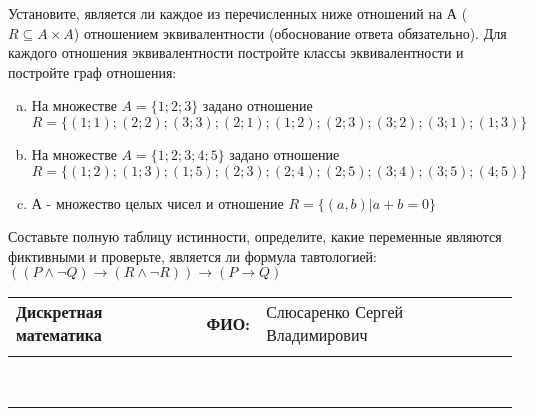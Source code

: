 \documentclass[10pt]{exam}
\newcommand{\class}{Дискретная математика}
\newcommand{\examdate}{}
\begin{document}
\begin{questions}
\question
Установите, является ли каждое из перечисленных ниже отношений на А ($R \subseteq A \times A$) отношением эквивалентности (обоснование ответа обязательно). Для каждого отношения эквивалентности постройте классы 
эквивалентности и постройте граф отношения:
\begin{enumerate} [a)]\setcounter{enumi}{0}
\item На множестве $A = \{1; 2; 3\}$ задано отношение $R = \{(1; 1); (2; 2); (3; 3); (2; 1); (1; 2); (2; 3); (3; 2); (3; 1); (1; 3)\}$
\item На множестве $A = \{1; 2; 3; 4; 5\}$ задано отношение $R = \{(1; 2); (1; 3); (1; 5); (2; 3); (2; 4); (2; 5); (3; 4); (3; 5); (4; 5)\}$
\item А - множество целых чисел и отношение $R = \{(a,b)|a + b = 0\}$
\end{enumerate}\question Составьте полную таблицу истинности, определите, какие переменные являются фиктивными и проверьте, является ли формула тавтологией:
$(( P \land \neg Q) \rightarrow (R \land \neg R)) \rightarrow (P \rightarrow Q)$

\end{questions}
\newpage
\begin{flushright}
\begin{tabular}{p{2.8in} r l}
\textbf{\class} & \textbf{ФИО:} &Слюсаренко Сергей Владимирович
\\

\textbf{\examdate} &&\\
\end{tabular}\\
\end{flushright}
\rule[1ex]{\textwidth}{.1pt}
\end{document}
